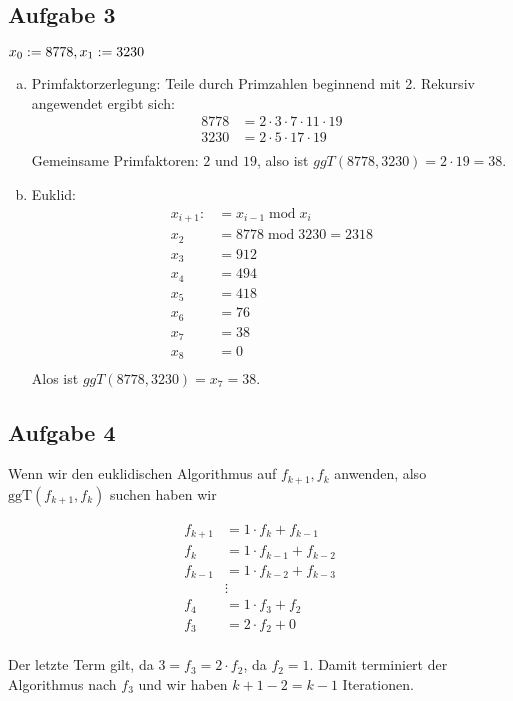 \subsection*{Aufgabe 3}
$x_0 := 8778, x_1 := 3230 \\$
\begin{enumerate}[a)]
  \item Primfaktorzerlegung:
  Teile durch Primzahlen beginnend mit 2. Rekursiv angewendet ergibt sich:
\begin{align*}
8778 &= 2 \cdot 3 \cdot 7 \cdot 11 \cdot 19 \\
3230 &= 2 \cdot 5 \cdot 17 \cdot 19 \\
\end{align*}
Gemeinsame Primfaktoren: $2$ und $19$, also ist $ggT(8778, 3230) = 2 \cdot 19 = 38$.
  \item Euklid:
\begin{align*}
x_{i+1} :&= x_{i-1} \; \text{mod} \; x_i \\
x_2 &= 8778 \; \text{mod} \; 3230 = 2318 \\
x_3 &= 912 \\
x_4 &= 494 \\
x_5 &= 418 \\
x_6 &= 76 \\
x_7 &= 38 \\
x_8 &= 0 \\
\end{align*}
Alos ist $ggT(8778, 3230) = x_7 = 38$.
\end{enumerate}

\subsection*{Aufgabe 4}

Wenn wir den euklidischen Algorithmus auf $f_{k+1}, f_k$ anwenden, also $\text{ggT}(f_{k+1}, f_k)$ suchen haben wir

\begin{align*}
f_{k+1} &= 1 \cdot f_k + f_{k-1} \\
f_{k}   &= 1 \cdot f_{k-1} + f_{k-2} \\
f_{k-1} &= 1 \cdot f_{k-2} + f_{k-3} \\
        &\vdots \\
f_4 &= 1 \cdot f_3 + f_2 \\
f_3 &= 2 \cdot f_2 + 0 \\
\end{align*}

Der letzte Term gilt, da $3 = f_3 = 2 \cdot f_2$, da $f_2 = 1$. Damit terminiert der Algorithmus nach $f_3$ und wir haben $k+1-2 = k-1$ Iterationen.
